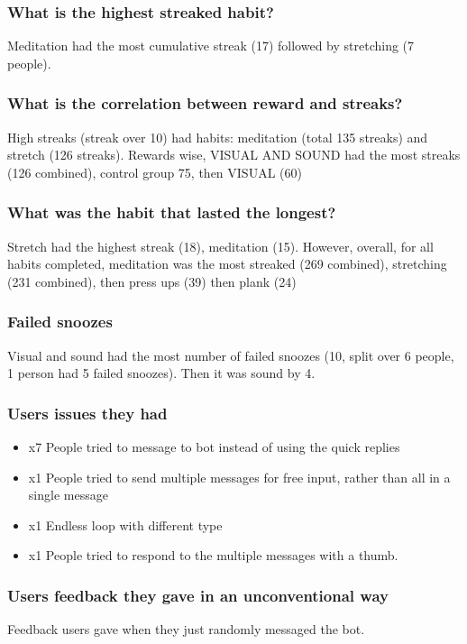 \documentclass{scaffold/sigchi}
\begin{document}
\subsubsection{What is the highest streaked habit?}
Meditation had the most cumulative streak (17) followed by stretching (7 people).

\subsubsection{What is the correlation between reward and streaks?}
High streaks (streak over 10) had habits: meditation (total 135 streaks) and stretch (126 streaks). Rewards wise, VISUAL AND SOUND had the most streaks (126 combined), control group 75, then VISUAL (60)


\subsubsection{What was the habit that lasted the longest?}
Stretch had the highest streak (18), meditation (15). However, overall, for all habits completed, meditation was the most streaked (269 combined), stretching (231 combined), then press ups (39) then plank (24)

\subsubsection{Failed snoozes}
Visual and sound had the most number of failed snoozes (10, split over 6 people, 1 person had 5 failed snoozes). Then it was sound by 4.

\subsubsection{Users issues they had}

\begin{itemize}
  \item x7 People tried to message to bot instead of using the quick replies
  \item x1 People tried to send multiple messages for free input, rather than all in a single message
  \item x1 Endless loop with different type
  \item x1 People tried to respond to the multiple messages with a thumb.
\end{itemize}


\subsubsection{Users feedback they gave in an unconventional way}
Feedback users gave when they just randomly messaged the bot.
\end{document}
